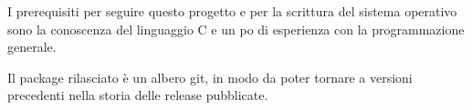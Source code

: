 \documentclass[a4paper,12pt]{report}
\begin{document}
I prerequisiti per seguire questo progetto e per la scrittura del sistema operativo sono la conoscenza del linguaggio C e un po di esperienza con la programmazione generale. 

Il package rilasciato è un albero git, in modo da poter tornare a versioni precedenti nella storia delle release pubblicate.



%
%
%
%
%
%
%
\end{document}
